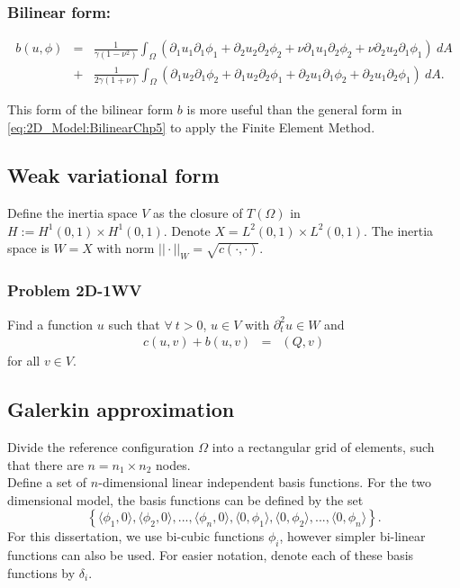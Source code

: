 \documentclass[../../main.tex]{subfiles}
\begin{document}
\subsubsection{Bilinear form:}
\begin{align}
	b(u,\phi) & = & \frac{1}{\gamma(1-\nu^2)}\int_{\Omega} (\partial_1 u_1 \partial_1 \phi_1 + \partial_2 u_2 \partial _2 \phi_2 + \nu\partial_1 u_1 \partial_2\phi_2 + \nu \partial_2 u_2 \partial_1 \phi_1 ) \ dA \nonumber\\
	& + & \frac{1}{2\gamma(1+\nu)}\int_{\Omega} (\partial_1 u_2 \partial_1 \phi_2 + \partial_1 u_2 \partial_2 \phi_1 + \partial_2 u_1 \partial_1\phi_2 + \partial_2 u_1 \partial_2\phi_1) \ dA.
\end{align}

This form of the bilinear form $b$ is more useful than the general form in \eqref{eq:2D_Model:BilinearChp5} to apply the Finite Element Method.

\subsection{Weak variational form}
Define the inertia space $V$ as the closure of $T(\Omega)$ in $H := H^1(0,1)\times H^1(0,1)$. Denote $X = L^2(0,1)\times L^2(0,1)$. The inertia space is $W  = X$ with norm $||\cdot||_W = \sqrt{c(\cdot,\cdot)}$.

\subsubsection{Problem 2D-1WV}
Find a function $u$ such that $\forall \ t > 0$, $u \in V$ with $\partial_t^2 u \in W$ and
\begin{eqnarray*}
	c(u,v) + b(u,v) & = & (Q,v)
\end{eqnarray*}
for all $v\in V$.


\subsection{Galerkin approximation}\label{2d_FEM_G}
Divide the reference configuration $\Omega$ into a rectangular grid of elements, such that there are $n = n_1\times n_2$ nodes.\\

Define a set of $n$-dimensional linear independent basis functions. For the two dimensional model, the basis functions can be defined by the set $$\left\{\langle\phi_1, 0\rangle, \langle\phi_2, 0\rangle,...,\langle\phi_{n}, 0 \rangle,\langle 0,\phi_1\rangle,\langle 0 ,\phi_2\rangle,...,\langle 0,\phi_{n}\rangle \right\}.$$ For this dissertation, we use bi-cubic functions $\phi_i$, however simpler bi-linear functions can also be used. For easier notation, denote each of these basis functions by $\delta_i$.\\
\end{document}
